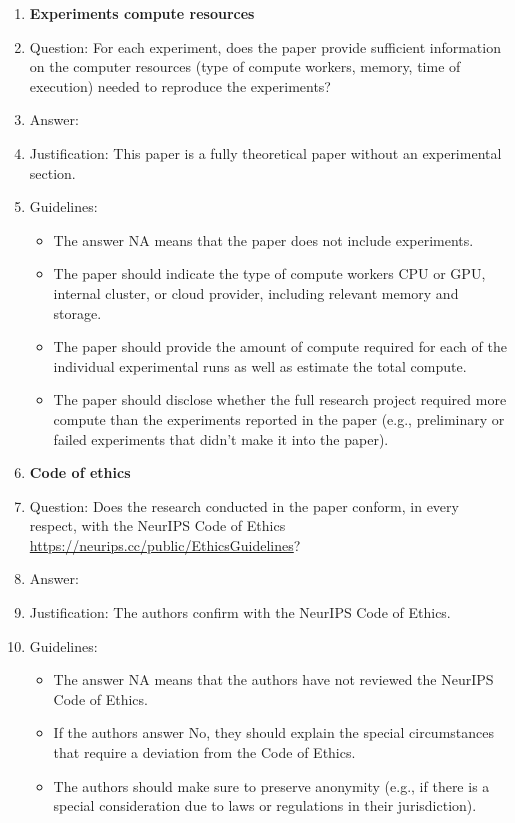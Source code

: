 \documentclass{article}
\theoremstyle{plain}
\theoremstyle{definition}
\theoremstyle{remark}
\begin{document}
\begin{enumerate}
\item {\bf Experiments compute resources}
    \item[] Question: For each experiment, does the paper provide sufficient information on the computer resources (type of compute workers, memory, time of execution) needed to reproduce the experiments?
    \item[] Answer: \answerNA{} %
    \item[] Justification: This paper is a fully theoretical paper without an experimental section.
    \item[] Guidelines:
    \begin{itemize}
        \item The answer NA means that the paper does not include experiments.
        \item The paper should indicate the type of compute workers CPU or GPU, internal cluster, or cloud provider, including relevant memory and storage.
        \item The paper should provide the amount of compute required for each of the individual experimental runs as well as estimate the total compute. 
        \item The paper should disclose whether the full research project required more compute than the experiments reported in the paper (e.g., preliminary or failed experiments that didn't make it into the paper). 
    \end{itemize}
    
\item {\bf Code of ethics}
    \item[] Question: Does the research conducted in the paper conform, in every respect, with the NeurIPS Code of Ethics \url{https://neurips.cc/public/EthicsGuidelines}?
    \item[] Answer: \answerYes{} %
    \item[] Justification: The authors confirm with the NeurIPS Code of Ethics.
    \item[] Guidelines:
    \begin{itemize}
        \item The answer NA means that the authors have not reviewed the NeurIPS Code of Ethics.
        \item If the authors answer No, they should explain the special circumstances that require a deviation from the Code of Ethics.
        \item The authors should make sure to preserve anonymity (e.g., if there is a special consideration due to laws or regulations in their jurisdiction).
    \end{itemize}



\end{enumerate}
\end{document}
